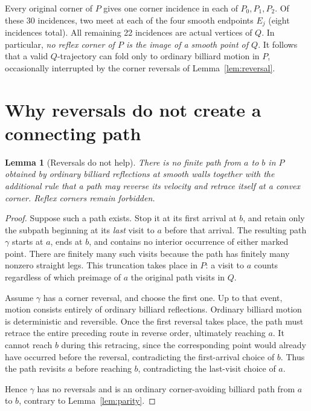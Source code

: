 \documentclass[11pt]{article}
\newtheorem{lemma}{Lemma}
\theoremstyle{remark}
\begin{document}
Every original corner of $P$ gives one corner incidence in each of $P_0,P_1,P_2$. Of these 30 incidences, two meet at each of the four smooth endpoints $E_j$ (eight incidences total). All remaining 22 incidences are actual vertices of $Q$. In particular, \emph{no reflex corner of $P$ is the image of a smooth point of $Q$}. It follows that a valid $Q$-trajectory can fold only to ordinary billiard motion in $P$, occasionally interrupted by the corner reversals of Lemma~\ref{lem:reversal}.

\section{Why reversals do not create a connecting path}
\begin{lemma}[Reversals do not help]\label{lem:nohelp}
There is no finite path from $a$ to $b$ in $P$ obtained by ordinary billiard reflections at smooth walls together with the additional rule that a path may reverse its velocity and retrace itself at a convex corner. Reflex corners remain forbidden.
\end{lemma}
\begin{proof}
Suppose such a path exists. Stop it at its first arrival at $b$, and retain only the subpath beginning at its \emph{last} visit to $a$ before that arrival. The resulting path $\gamma$ starts at $a$, ends at $b$, and contains no interior occurrence of either marked point. There are finitely many such visits because the path has finitely many nonzero straight legs. This truncation takes place in $P$: a visit to $a$ counts regardless of which preimage of $a$ the original path visits in $Q$.

Assume $\gamma$ has a corner reversal, and choose the first one. Up to that event, motion consists entirely of ordinary billiard reflections. Ordinary billiard motion is deterministic and reversible. Once the first reversal takes place, the path must retrace the entire preceding route in reverse order, ultimately reaching $a$. It cannot reach $b$ during this retracing, since the corresponding point would already have occurred before the reversal, contradicting the first-arrival choice of $b$. Thus the path revisits $a$ before reaching $b$, contradicting the last-visit choice of $a$.

Hence $\gamma$ has no reversals and is an ordinary corner-avoiding billiard path from $a$ to $b$, contrary to Lemma~\ref{lem:parity}.
\end{proof}
\end{document}
